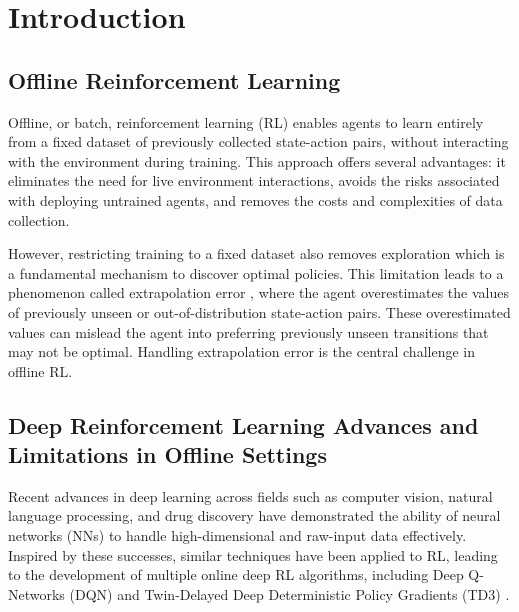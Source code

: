 \cleardoubleoddpage%
\chapter{Introduction}
\label{sec:introduction}

\section{Offline Reinforcement Learning}

Offline, or batch, reinforcement learning (RL) \cite{lange2012batch} enables agents to learn entirely from a fixed dataset of previously collected state-action pairs, without interacting with the environment during training. This approach offers several advantages: it eliminates the need for live environment interactions, avoids the risks associated with deploying untrained agents, and removes the costs and complexities of data collection.  

However, restricting training to a fixed dataset also removes exploration which is a fundamental mechanism to discover optimal policies. This limitation leads to a phenomenon called extrapolation error \cite{fujimoto2019offpolicy}, where the agent overestimates the values of previously unseen or out-of-distribution state-action pairs. These overestimated values can mislead the agent into preferring previously unseen transitions that may not be optimal. Handling extrapolation error is the central challenge in offline RL.





\section{Deep Reinforcement Learning Advances and Limitations in Offline Settings}



Recent advances in deep learning across fields such as computer vision, natural language processing, and drug discovery have demonstrated the ability of neural networks (NNs) to handle high-dimensional and raw-input data effectively. Inspired by these successes, similar techniques have been applied to RL, leading to the development of multiple online deep RL algorithms, including Deep Q-Networks (DQN) \cite{DQN} and Twin-Delayed Deep Deterministic Policy Gradients (TD3) \cite{TD3_online}.

